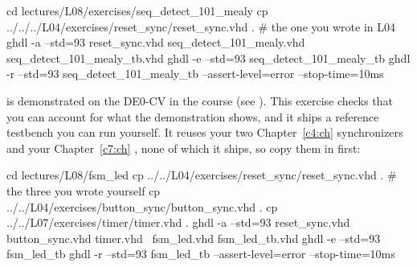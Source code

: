 \begin{shell}
cd lectures/L08/exercises/seq_detect_101_mealy
cp ../../../L04/exercises/reset_sync/reset_sync.vhd .     # the one you wrote in L04
ghdl -a --std=93 reset_sync.vhd seq_detect_101_mealy.vhd seq_detect_101_mealy_tb.vhd
ghdl -e --std=93 seq_detect_101_mealy_tb
ghdl -r --std=93 seq_detect_101_mealy_tb --assert-level=error --stop-time=10ms
\end{shell}

\label{c8:set:4}

\label{c8:ex:5}
 is demonstrated on the DE0-CV in the course (see ). This exercise
checks that you can account for what the demonstration shows, and it ships a reference testbench
you can run yourself. It reuses your two Chapter~\ref{c4:ch} synchronizers and your
Chapter~\ref{c7:ch} , none of which it ships, so copy them in first:

\begin{shell}
cd lectures/L08/fsm_led
cp ../../L04/exercises/reset_sync/reset_sync.vhd .     # the three you wrote yourself
cp ../../L04/exercises/button_sync/button_sync.vhd .
cp ../../L07/exercises/timer/timer.vhd .
ghdl -a --std=93 reset_sync.vhd button_sync.vhd timer.vhd \
                 fsm_led.vhd fsm_led_tb.vhd
ghdl -e --std=93 fsm_led_tb
ghdl -r --std=93 fsm_led_tb --assert-level=error --stop-time=10ms
\end{shell}

